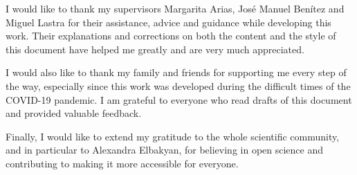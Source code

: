 I would like to thank my supervisors Margarita Arias, José Manuel Benítez and Miguel Lastra for their assistance, advice and guidance while developing this work. Their explanations and corrections on both the content and the style of this document have helped me greatly and are very much appreciated.

I would also like to thank my family and friends for supporting me every step of the way, especially since this work was developed during the difficult times of the COVID-19 pandemic. I am grateful to everyone who read drafts of this document and provided valuable feedback.

Finally, I would like to extend my gratitude to the whole scientific community, and in particular to Alexandra Elbakyan, for believing in open science and contributing to making it more accessible for everyone.
